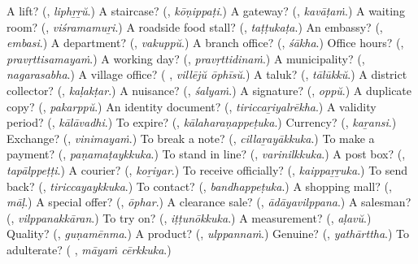 \begin{tcolorbox}[breakable,colback=teal!4,colframe=teal!35!black,title={Before you move on}]
A lift? (\textbf{}, \emph{liphṟṟŭ}.) A staircase? (\textbf{}, \emph{kōṇippaṭi}.) A gateway? (\textbf{}, \emph{kavāṭaṁ}.) A waiting room? (\textbf{}, \emph{viśramamuṟi}.) A roadside food stall? (\textbf{}, \emph{taṭṭukaṭa}.) An embassy? (\textbf{}, \emph{embasi}.) A department? (\textbf{}, \emph{vakuppŭ}.) A branch office? (\textbf{}, \emph{śākha}.) Office hours? (\textbf{}, \emph{pravṛttisamayaṁ}.) A working day? (\textbf{}, \emph{pravṛttidinaṁ}.) A municipality? (\textbf{}, \emph{nagarasabha}.) A village office? (\textbf{ }, \emph{villējŭ ōphīsŭ}.) A taluk? (\textbf{}, \emph{tālūkkŭ}.) A district collector? (\textbf{}, \emph{kaḷakṭar}.) A nuisance? (\textbf{}, \emph{śalyaṁ}.) A signature? (\textbf{}, \emph{oppŭ}.) A duplicate copy? (\textbf{}, \emph{pakarppŭ}.) An identity document? (\textbf{}, \emph{tiriccaṟiyalrēkha}.) A validity period? (\textbf{}, \emph{kālāvadhi}.) To expire? (\textbf{}, \emph{kālaharaṇappeṭuka}.) Currency? (\textbf{}, \emph{kaṟansi}.) Exchange? (\textbf{}, \emph{vinimayaṁ}.) To break a note? (\textbf{}, \emph{cillaṟayākkuka}.) To make a payment? (\textbf{}, \emph{paṇamaṭaykkuka}.) To stand in line? (\textbf{}, \emph{varinilkkuka}.) A post box? (\textbf{}, \emph{tapālppeṭṭi}.) A courier? (\textbf{}, \emph{koṟiyar}.) To receive officially? (\textbf{}, \emph{kaippaṟṟuka}.) To send back? (\textbf{}, \emph{tiriccayaykkuka}.) To contact? (\textbf{}, \emph{bandhappeṭuka}.) A shopping mall? (\textbf{}, \emph{māḷ}.) A special offer? (\textbf{}, \emph{ōphar}.) A clearance sale? (\textbf{}, \emph{ādāyavilppana}.) A salesman? (\textbf{}, \emph{vilppanakkāran}.) To try on? (\textbf{}, \emph{iṭṭunōkkuka}.) A measurement? (\textbf{}, \emph{aḷavŭ}.) Quality? (\textbf{}, \emph{guṇamēnma}.) A product? (\textbf{}, \emph{ulppannaṁ}.) Genuine? (\textbf{}, \emph{yathārttha}.) To adulterate? (\textbf{ }, \emph{māyaṁ cērkkuka}.)
\end{tcolorbox}
